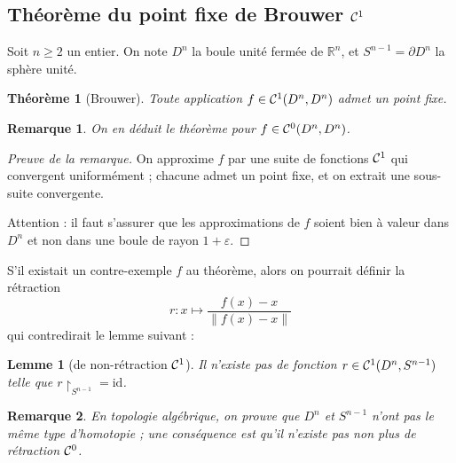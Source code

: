\documentclass[a4paper, 11pt]{article}
\def\R{\mathbb{R}}
\def\Cf{{\cal{C}}}
\newtheorem*{theorem}{Théorème}
\newtheorem*{lemma}{Lemme}
\newtheorem*{remark}{Remarque}
\begin{document}
\newpage


\subsection{Théorème du point fixe de Brouwer $\Cf^1$}

Soit $n \geq 2$ un entier. On note $D^n$ la boule unité fermée de $\R^n$, et
$S^{n-1} = \partial D^n$ la sphère unité.

\begin{theorem}[Brouwer]
  Toute application $f \in \Cf^1(D^n, D^n)$ admet un point fixe.
\end{theorem}

\begin{remark}
  On en déduit le théorème pour $f \in \Cf^0(D^n, D^n)$.
\end{remark}
\begin{proof}[Preuve de la remarque]
  On approxime $f$ par une suite de fonctions $\Cf^1$ qui convergent
  uniformément ; chacune admet un point fixe, et on extrait une sous-suite
  convergente.

  Attention : il faut s'assurer que les approximations de $f$ soient bien à
  valeur dans $D^n$ et non dans une boule de rayon $1+\varepsilon$.
\end{proof}

S'il existait un contre-exemple $f$ au théorème, alors on pourrait définir la
rétraction
\[ r : x \mapsto \frac{f(x) - x}{\|f(x) - x\|}\]
qui contredirait le lemme suivant :

\begin{lemma}[de non-rétraction $\Cf^1$]
  Il n'existe pas de fonction $r \in \Cf^1(D^n, S^{n-1})$ telle que
  $r\restriction_{S^{n-1}} = \mathrm{id}$.
\end{lemma}
\begin{remark}
En topologie algébrique, on prouve que $D^n$ et $S^{n-1}$ n'ont pas le même type
d'homotopie ; une conséquence est qu'il n'existe pas non plus de rétraction
$\Cf^0$.
\end{remark}
\end{document}

